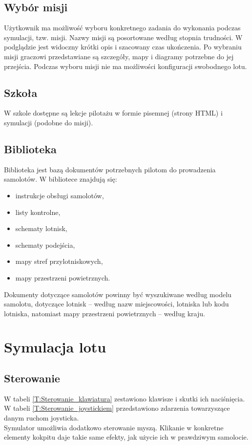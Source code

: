 \documentclass{mwrep}
\begin{document}
\subsection{Wybór misji}

Użytkownik ma możliwość wyboru konkretnego zadania do wykonania podczas symulacji, tzw. misji. Nazwy misji są posortowane według stopnia trudności. W podglądzie jest widoczny krótki opis i szacowany czas ukończenia. Po wybraniu misji graczowi przedstawiane są szczegóły, mapy i diagramy potrzebne do jej przejścia. Podczas wyboru misji nie ma możliwości konfiguracji swobodnego lotu.

\subsection{Szkoła}
W szkole dostępne są lekcje pilotażu w formie pisemnej (strony HTML) i symulacji (podobne do misji).

\subsection{Biblioteka}
Biblioteka jest bazą dokumentów potrzebnych pilotom do prowadzenia samolotów. W bibliotece znajdują się:
\begin{itemize}
\item instrukcje obsługi samolotów,
\item listy kontrolne,
\item schematy lotnisk,
\item schematy podejścia,
\item mapy stref przylotniskowych,
\item mapy przestrzeni powietrznych.
\end{itemize}

Dokumenty dotyczące samolotów powinny być wyszukiwane według modelu samolotu, dotyczące lotnisk -- według nazw miejscowości, lotniska lub kodu lotniska, natomiast mapy przestrzeni powietrznych -- według kraju.

\section{Symulacja lotu}

\subsection{Sterowanie}

W tabeli \ref{T:Sterowanie_klawiatura} zestawiono klawisze i skutki ich naciśnięcia. W tabeli \ref{T:Sterowanie_joystickiem} przedstawiono zdarzenia towarzyszące danym ruchom joysticka.\\
Symulator umożliwia dodatkowo sterowanie myszą. Klikanie w konkretne elementy kokpitu daje takie same efekty, jak użycie ich w prawdziwym samolocie.
\end{document}
